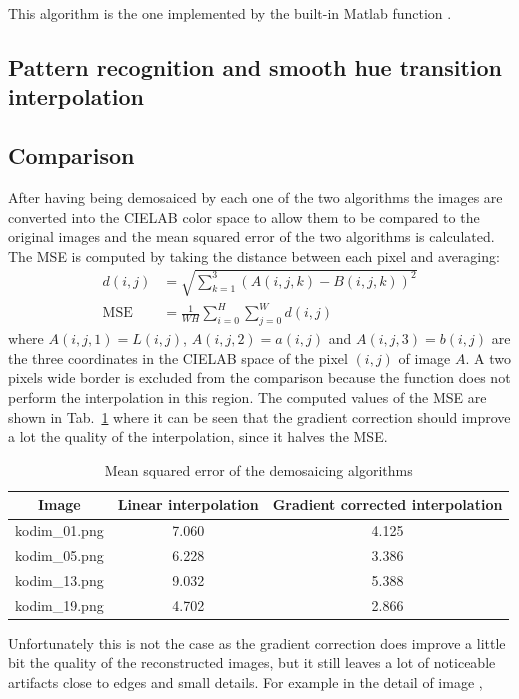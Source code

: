 \documentclass[a4paper,oneside]{article}
\begin{document}
This algorithm is the one implemented by the built-in Matlab function
.

\subsection{Pattern recognition and smooth hue transition interpolation}

\subsection*{Comparison}
After having being demosaiced by each one of the two algorithms the
images are converted into the CIELAB color space to allow them to be
compared to the original images and the mean squared error of the two
algorithms is calculated. The MSE is computed by taking the distance
between each pixel and averaging:
\begin{align*}
  d(i,j) &= \sqrt{\sum_{k=1}^3 \left(A(i,j,k) - B(i,j,k)\right)^2 } \\
  \text{MSE} &= \frac{1}{WH}\sum_{i=0}^H\sum_{j=0}^Wd(i,j)
\end{align*}
where $A(i,j,1) = L(i,j)$, $A(i,j,2) = a(i,j)$ and $A(i,j,3) = b(i,j)$
are the three coordinates in the CIELAB space of the pixel $(i,j)$ of
image $A$. A two pixels wide border is excluded from the comparison
because the function  does not perform the
interpolation in this region.  The computed values of the MSE are
shown in Tab.~\ref{tab:mse} where it can be seen that the gradient
correction should improve a lot the quality of the interpolation,
since it halves the MSE.
\begin{table}[h]
  \centering
  \begin{tabular}{ccc}
    Image & Linear interpolation & Gradient corrected interpolation \\
    \hline
    kodim\_01.png & 7.060 & 4.125 \\
    kodim\_05.png & 6.228 & 3.386 \\
    kodim\_13.png & 9.032 & 5.388 \\
    kodim\_19.png & 4.702 & 2.866
  \end{tabular}
  \caption{Mean squared error of the demosaicing algorithms}
  \label{tab:mse}
\end{table}
Unfortunately this is not the case as the gradient correction does
improve a little bit the quality of the reconstructed images, but it
still leaves a lot of noticeable artifacts close to edges and small
details. For example in the detail of image ,
\end{document}
